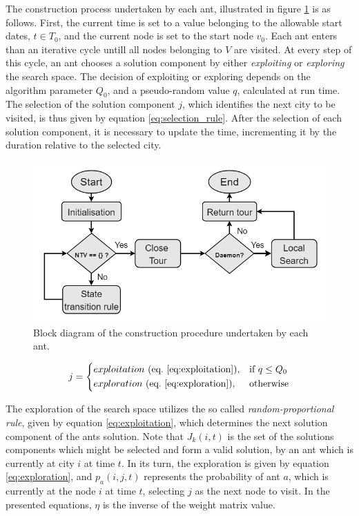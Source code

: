 The construction process undertaken by each ant, illustrated in figure \ref{fig:aco_construction} is as follows.
First, the current time is set to a value belonging to the allowable start dates, $t \in T_0$,
and the current node is set to the start node $v_0$.
Each ant enters than an iterative cycle untill all nodes belonging to $V$ are visited.
At every step of this cycle, an ant chooses a solution component by either \textit{exploiting}
or \textit{exploring} the search space. The decision of exploiting or exploring 
depends on the algorithm parameter $Q_0$, and a pseudo-random value $q$,
calculated at run time. The selection of the solution component $j$, which identifies the next city to be visited,
is thus given by equation \ref{eq:selection_rule}.
After the selection of each solution component, it is necessary to update the time, 
incrementing it by the duration relative to the selected city.

\begin{figure}[htpb]
  \centering
  \includegraphics[width=\textwidth]{./Figures/system_implementation/aco_construction.png}
  \caption{Block diagram of the construction procedure undertaken by each ant.}
  \label{fig:aco_construction}  
\end{figure}

\begin{equation}
  \label{eq:selection_rule}
  j =  \left \{
    \begin{aligned}
      & exploitation \ (\text{eq.} \ \ref{eq:exploitation}) , && \text{if}\ q \leq Q_0 \\
      & exploration \ (\text{eq.} \ \ref{eq:exploration}), && \text{otherwise}
    \end{aligned} \right. 
\end{equation}

The exploration of the search space utilizes the so called \textit{random-proportional rule},
given by equation \ref{eq:exploitation}, which determines the next solution component 
of the ants solution. Note that $J_k(i,t)$ is the set of the solutions components 
which might be selected and form a valid solution, by an ant which is currently at city $i$ at time $t$.
In its turn, the exploration is given by equation \ref{eq:exploration},
and $p_a(i,j,t)$ represents the probability of ant $a$,
which is currently at the node $i$ at time $t$, selecting $j$ as the next node to visit.
In the presented equations, $\eta$ is the inverse of the weight matrix value.

